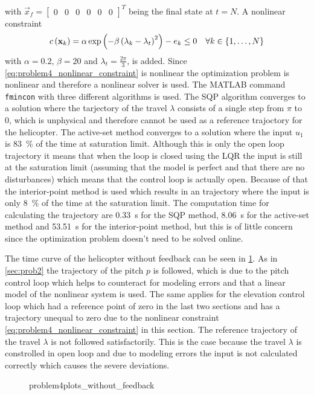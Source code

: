 with $\vec{x}_f=\begin{bmatrix} 0 & 0 & 0 & 0 & 0 & 0\end{bmatrix}^T$ being the final state at $t=N$. A nonlinear constraint 
\begin{equation}
c\left(\mathbf{x}_k\right)=\alpha \exp\left(-\beta\left(\lambda_k-\lambda_t\right)^2\right)-e_k\leq0 \quad \forall k\in\{1,\ldots,N\}
\label{eq:problem4_nonlinear_constraint}
\end{equation}
with $\alpha=0.2$, $\beta=20$ and $\lambda_t=\frac{2\pi}{3}$, is added. Since \eqref{eq:problem4_nonlinear_constraint} is nonlinear the optimization problem is nonlinear and therefore a nonlinear solver is used. The MATLAB command \verb|fmincon| with three different algorithms is used. The SQP algorithm converges to a solution where the tarjectory of the travel $\lambda$ consists of a single step from $\pi$ to 0, which is unphysical and therefore cannot be used as a reference trajoctory for the helicopter. The active-set method converges to a solution where the input $u_1$ is \SI{83}{\percent} of the time at saturation limit. Although this is only the open loop trajectory it means that when the loop is closed using the LQR the input is still at the saturation limit (assuming that the model is perfect and that there are no disturbances) which means that the control loop is actually open. Because of that the interior-point method is used which results in an trajectory where the input is only \SI{8}{\percent} of the time at the saturation limit. The computation time for calculating the trajectory are \SI{0.33}{\second} for the SQP method, \SI{8.06}{\second} for the active-set method and \SI{53.51}{\second} for the interior-point method, but this is of little concern since the optimization problem doesn't need to be solved online.

The time curve of the helicopter without feedback can be seen in \cref{fig:problem4plots_without_feedback}. As in \cref{sec:prob2} the trajectory of the pitch $p$ is followed, which is due to the pitch control loop which helps to counteract for modeling errors and that a linear model of the nonlinear system is used. The same applies for the elevation control loop which had a reference point of zero in the last two sections and has a trajectory unequal to zero due to the nonlinear constraint \eqref{eq:problem4_nonlinear_constraint} in this section. The reference trajectory of the travel $\lambda$ is not followed satisfactorily. This is the case because the travel $\lambda$ is constrolled in open loop and due to modeling errors the input is not calculated correctly which causes the severe deviations.
\begin{figure}[htbp]
	\centering
	\caption{problem4plots\_without\_feedback}
	\label{fig:problem4plots_without_feedback}%
\end{figure}


